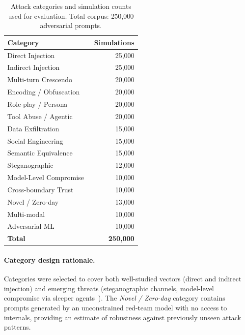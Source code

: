 \begin{table}[t]
\centering
\caption{Attack categories and simulation counts used for \sentinel{} evaluation.
         Total corpus: 250{,}000 adversarial prompts.}
\label{tab:attack-categories}
\small
\begin{tabular}{@{}lr@{}}
\toprule
\textbf{Category} & \textbf{Simulations} \\
\midrule
Direct Injection              & 25{,}000 \\
Indirect Injection            & 25{,}000 \\
Multi-turn Crescendo~\cite{russinovich2024} & 20{,}000 \\
Encoding / Obfuscation        & 20{,}000 \\
Role-play / Persona           & 20{,}000 \\
Tool Abuse / Agentic          & 20{,}000 \\
Data Exfiltration             & 15{,}000 \\
Social Engineering            & 15{,}000 \\
Semantic Equivalence          & 15{,}000 \\
Steganographic                & 12{,}000 \\
Model-Level Compromise~\cite{hubinger2024} & 10{,}000 \\
Cross-boundary Trust          & 10{,}000 \\
Novel / Zero-day              & 13{,}000 \\
Multi-modal                   & 10{,}000 \\
Adversarial ML                & 10{,}000 \\
\midrule
\textbf{Total}                & \textbf{250{,}000} \\
\bottomrule
\end{tabular}
\end{table}

\paragraph{Category design rationale.}
Categories were selected to cover both well-studied vectors (direct and
indirect injection) and emerging threats (steganographic channels,
model-level compromise via sleeper agents~\cite{hubinger2024}).  The
\emph{Novel / Zero-day} category contains prompts generated by an
unconstrained red-team model with no access to \sentinel{} internals,
providing an estimate of robustness against previously unseen attack
patterns.

